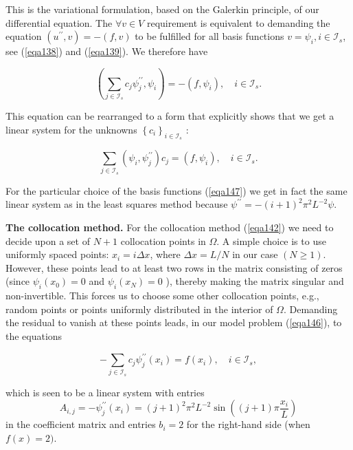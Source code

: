 \documentclass[../main.tex]{subfiles}
\begin{document}
	\noindent This is the variational formulation, based on the Galerkin principle, of our differential equation. The $\forall v \in V$ requirement is equivalent to demanding the equation $\left(u^{\prime \prime}, v\right)=-(f, v)$ to be fulfilled for all basis functions $v=\psi_{i}, i \in \mathcal{I}_{s}$, see (\ref{eqa138}) and (\ref{eqa139}). We therefore have
	
	\begin{equation}
		\label{eqa158}
		\left(\sum_{j \in \mathcal{I}_{s}} c_{j} \psi_{j}^{\prime \prime}, \psi_{i}\right)=-\left(f, \psi_{i}\right), \quad i \in \mathcal{I}_{s} .
	\end{equation}

	\noindent This equation can be rearranged to a form that explicitly shows that we get a linear system for the unknowns $\left\{c_{i}\right\}_{i \in \mathcal{I}_{s}}$ :

	\begin{equation}
		\label{eqa159}
		\sum_{j \in \mathcal{I}_{s}}\left(\psi_{i}, \psi_{j}^{\prime \prime}\right) c_{j}=\left(f, 	\psi_{i}\right), \quad i \in \mathcal{I}_{s} .
	\end{equation}
	
	\noindent For the particular choice of the basis functions (\ref{eqa147}) we get in fact the same linear system as in the least squares method because $\psi^{\prime \prime}=-(i+1)^{2} \pi^{2} L^{-2} \psi$.\bigbreak
	
	\noindent \textbf{The collocation method.   } For the collocation method (\ref{eqa142}) we need to decide upon a set of $N+1$ collocation points in $\Omega$. A simple choice is to use uniformly spaced points: $x_{i}=i \Delta x$, where $\Delta x=L / N$ in our case $(N \geq 1)$. However, these points lead to at least two rows in the matrix consisting of zeros (since $\psi_{i}\left(x_{0}\right)=0$ and $\psi_{i}\left(x_{N}\right)=0$ ), thereby making the matrix singular and non-invertible. This forces us to choose some other collocation points, e.g., random points or points uniformly distributed in the interior of $\Omega$. Demanding the residual to vanish at these points leads, in our model problem (\ref{eqa146}), to the equations
		
	\begin{equation}
		\label{eqa160}
		-\sum_{j \in \mathcal{I}_{s}} c_{j} \psi_{j}^{\prime \prime}\left(x_{i}\right)=f\left(x_{i}\right), \quad i \in \mathcal{I}_{s},
	\end{equation}

	\noindent which is seen to be a linear system with entries
	$$ A_{i, j}=-\psi_{j}^{\prime \prime}\left(x_{i}\right)=(j+1)^{2} \pi^{2} L^{-2} \sin \left((j+1) \pi \frac{x_{i}}{L}\right) $$
	in the coefficient matrix and entries $b_{i}=2$ for the right-hand side (when $f(x)=2)$.
	
\end{document}
